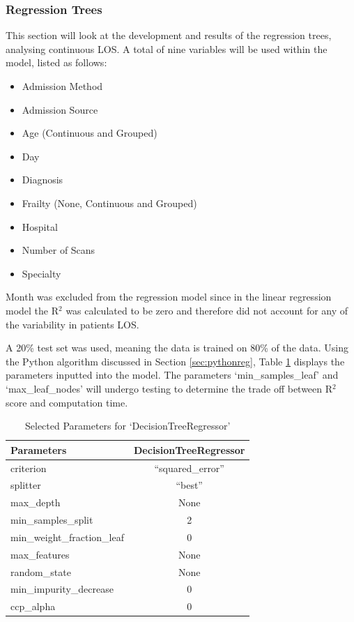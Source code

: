 \documentclass[../thesis.tex]{subfiles}
\begin{document}
\subsubsection{Regression Trees}\label{sec:regressiontrees}
This section will look at the development and results of the regression trees, analysing continuous LOS. A total of nine variables will be used within the model, listed as follows:
\begin{multicols}{2}
\begin{itemize}
    \item Admission Method
    \item Admission Source
    \item Age (Continuous and Grouped)
    \item Day
    \item Diagnosis
    \item Frailty (None, Continuous and Grouped)
    \item Hospital
    \item Number of Scans
    \item Specialty
\end{itemize}
\end{multicols}

Month was excluded from the regression model since in the linear regression model the R$^{2}$ was calculated to be zero and therefore did not account for any of the variability in patients LOS.

A 20\% test set was used, meaning the data is trained on 80\% of the data. Using the Python algorithm discussed in Section \ref{sec:pythonreg}, Table \ref{tab:ParametersRegression} displays the parameters inputted into the model. The parameters `min\_samples\_leaf' and `max\_leaf\_nodes' will undergo testing to determine the trade off between R$^{2}$ score and computation time.


\begin{table}[h!]
    \centering
    \begin{tabular}{lc} \toprule
        \textbf{Parameters} & \textbf{DecisionTreeRegressor} \\\midrule
         criterion& ``squared\_error''\\
         splitter & ``best'' \\
         max\_depth & None \\
         min\_samples\_split & 2 \\
         min\_weight\_fraction\_leaf & 0 \\
         max\_features & None \\
         random\_state & None \\
         min\_impurity\_decrease & 0 \\
         ccp\_alpha & 0 \\\bottomrule
    \end{tabular}
    \caption{Selected Parameters for `DecisionTreeRegressor'}
    \label{tab:ParametersRegression}
\end{table}
\end{document}
